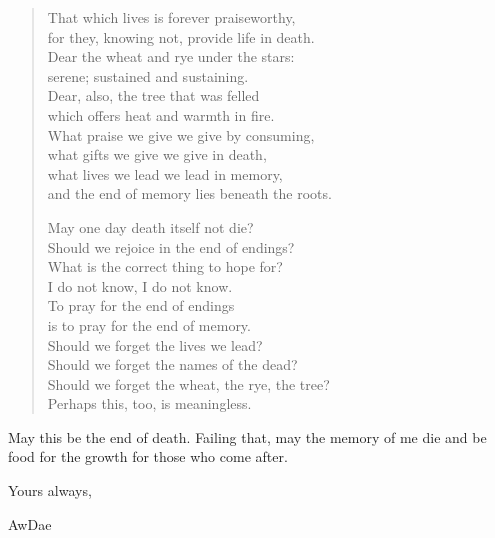\begin{verse}
That which lives is forever praiseworthy,\\
for they, knowing not, provide life in death.\\
Dear the wheat and rye under the stars:\\
serene; sustained and sustaining.\\
Dear, also, the tree that was felled\\
which offers heat and warmth in fire.\\
What praise we give we give by consuming,\\
what gifts we give we give in death,\\
what lives we lead we lead in memory,\\
and the end of memory lies beneath the roots.

May one day death itself not die?\\
Should we rejoice in the end of endings?\\
What is the correct thing to hope for?\\
I do not know, I do not know.\\
To pray for the end of endings\\
is to pray for the end of memory.\\
Should we forget the lives we lead?\\
Should we forget the names of the dead?\\
Should we forget the wheat, the rye, the tree?\\
Perhaps this, too, is meaningless.
\end{verse}

May this be the end of death. Failing that, may the memory of me die and be food for the growth for those who come after.

Yours always,

AwDae
